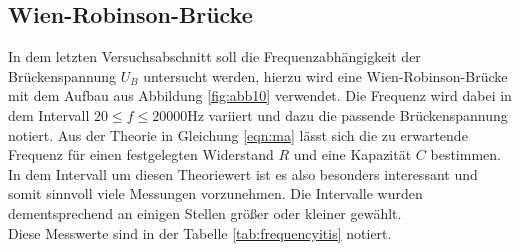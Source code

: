 \subsection{Wien-Robinson-Brücke}
In dem letzten Versuchsabschnitt soll die Frequenzabhängigkeit der Brückenspannung $U_{B}$ untersucht werden, hierzu wird eine Wien-Robinson-Brücke mit dem Aufbau aus 
Abbildung \ref{fig:abb10} verwendet. Die Frequenz wird dabei in dem Intervall $20 \leq f \leq 20000 \si{\hertz}$ variiert und dazu die passende Brückenspannung notiert. Aus der Theorie in Gleichung \eqref{eqn:ma}
lässt sich die zu erwartende Frequenz für einen festgelegten Widerstand $R$ und eine Kapazität $C$ bestimmen. In dem Intervall um diesen Theoriewert ist es also besonders interessant und somit sinnvoll viele Messungen vorzunehmen.
Die Intervalle wurden dementsprechend an einigen Stellen größer oder kleiner gewählt. 
\\
\newline
Diese Messwerte sind in der Tabelle \ref{tab:frequencyitis} notiert.

